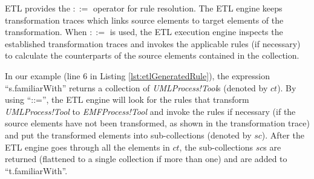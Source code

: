 


ETL provides the $::=$ operator for rule resolution. 
The ETL engine keeps transformation traces which links source elements to target elements of the transformation. 
When $::=$ is used, the ETL execution engine inspects the established transformation traces and invokes the applicable rules (if necessary) to calculate the counterparts of the source elements contained in the collection. 


In our example (line 6 in Listing \ref{lst:etlGeneratedRule}), the expression ``s.familiarWith'' returns a collection of \emph{UMLProcess!Tool}s (denoted by $ct$). By using ``::='', the ETL engine will look for the rules that transform \emph{UMLProcess!Tool} to \emph{EMFProcess!Tool} and invoke the rules if 
necessary (if the source elements have not been transformed, as shown in the transformation trace) and put the transformed elements into sub-collections 
(denoted by $sc$). 
After the ETL engine goes through all the elements in $ct$, the sub-collections $sc$s are returned (flattened to a single collection if more than one) and are added to ``t.familiarWith''.

